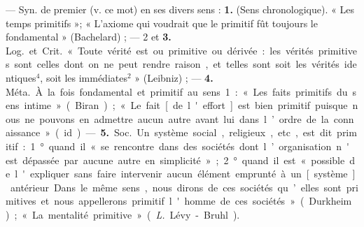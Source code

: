 \begin{itemize}[leftmargin=1cm, label=, itemsep=1pt]
 — Syn. de premier (v. ce
mot) en ses divers sens : {\bf 1.} (Sens
chronologique). « Les temps primitifs »; « L’axiome qui voudrait
que le primitif fût toujours le fondamental » (Bachelard) ; — 2 et {\bf 3.} \si{Log.}
et \si{Crit.} « Toute vérité est ou primitive ou dérivée : les vérités primitives sont celles dont on ne peut
rendre raison, et telles sont soit les
vérités identiques$^4$, soit les immédiates$^2$ » (Leibniz) ; — {\bf 4.} \si{Méta.} À la
fois fondamental et primitif au
sens 1 : « Les faits primitifs du sens
intime » (Biran) ; « Le fait [de
l'effort] est bien primitif puisque
nous ne pouvons en admettre aucun
autre avant lui dans l’ordre de la
connaissance » (id.).

— {\bf 5.} \si{Soc.} Un système social,
religieux, etc, est dit primitif :
1° quand il « se rencontre dans des
sociétés dont l’organisation n'est
dépassée par aucune autre en simplicité » ; 2° quand il est « possible
de l'expliquer sans faire intervenir
aucun élément emprunté à un [système] antérieur. Dans le même sens,
nous dirons de ces sociétés qu’elles
sont primitives et nous appellerons
primitif l'homme de ces sociétés »
(Durkheim) ; « La mentalité primitive » ({\it L.} Lévy-Bruhl).


\end{itemize}
